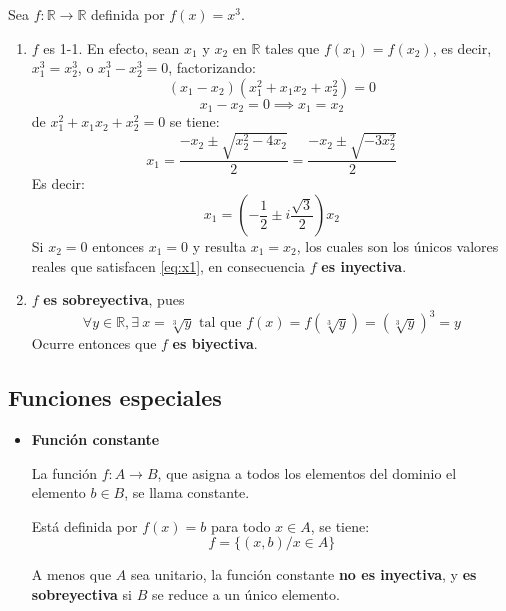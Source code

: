 \begin{fmd-example}
	Sea $f: \mathbb{R} \rightarrow \mathbb{R}$ definida por $f(x) = x^3$.
	\begin{enumerate}
		\item $f$ es 1-1. En efecto, sean $x_1$ y $x_2$ en $\mathbb{R}$ tales que
		$f(x_1) = f(x_2)$, es decir, $x_1^3 = x_2^3$, o $x_1^3 - x_2^3 = 0$,
		factorizando: \[(x_1 - x_2)(x_1^2 + x_1x_2 + x_2^2) = 0\]
		\[ x_1 - x_2 = 0 \implies x_1 = x_2 \]
		de $x_1^2 + x_1x_2 + x_2^2=0$ se tiene:
		\[ x_1 = \frac{-x_2 \pm \sqrt{x_2^2 - 4 x_2} }{2} =
		\frac{-x_2 \pm \sqrt{-3x_2^2}}{2} \]
		Es decir:
		\begin{equation} \label{eq:x1}
			x_1 = \left( -\frac{1}{2} \pm i \frac{\sqrt{3}}{2} \right) x_2
		\end{equation}
		Si $x_2=0$ entonces $x_1 = 0$ y resulta $x_1 = x_2$, los cuales son los únicos
		valores reales que satisfacen \eqref{eq:x1}, en consecuencia $f$ \textbf{es inyectiva}.
		
		\item $f$ \textbf{es sobreyectiva}, pues
		\[ \forall y \in \mathbb{R}, \exists \ x = \sqrt[3]{y} \mbox{ tal que }
		f(x) = f(\sqrt[3]{y}) = \left( \sqrt[3]{y} \right)^3 = y\]
		Ocurre entonces que $f$ \textbf{es biyectiva}.
	\end{enumerate}
\end{fmd-example}

\subsection{Funciones especiales} \label{sec:especiales}

\begin{itemize}
	\item \textbf{Función constante}
	
	La función $f: A \rightarrow B$, que asigna a todos los elementos del dominio el
	elemento $b \in B$, se llama constante.
	
	Está definida por $f(x) = b$ para todo $x \in A$, se tiene:
	\[ f = \{ (x, b) / x \in A \} \]
	
	A menos que $A$ sea unitario, la función constante \textbf{no es inyectiva}, y
	\textbf{es sobreyectiva} si $B$ se reduce a un único elemento.
\end{itemize}
\begin{figure}[H]
	\centering
\end{figure}


